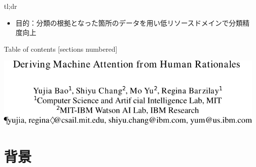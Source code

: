\begin{frame}{tl;dr}
\begin{itemize}
\item 目的：分類の根拠となった箇所のデータを用い低リソースドメインで分類精度向上

\end{itemize}

\end{frame}

\begin{frame}{Table of contents}
  [sections numbered]
  \tableofcontents[hideallsubsections]
\end{frame}

\begin{frame}[c]
  \begin{center}
    \includegraphics[width=\linewidth]{fig/title.pdf}    
  \end{center}
\end{frame}

\section{背景}
\frame[standout]{\insertsection}

